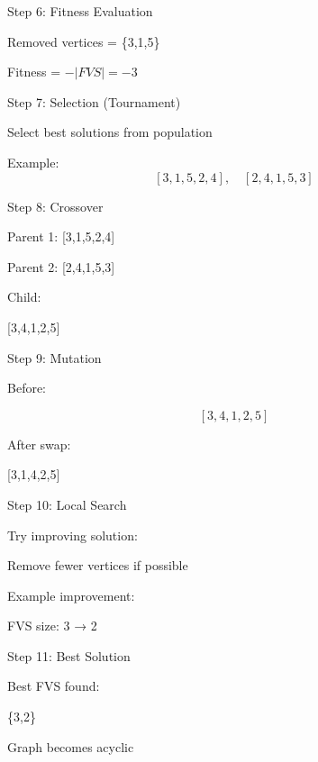 \documentclass[10pt,a4paper]{report}
\theoremstyle{definition}
\begin{document}
{Step 6: Fitness Evaluation}
\begin{center}
	Removed vertices = \{3,1,5\}

	\vspace{0.5cm}
	Fitness = $-|FVS| = -3$
\end{center}

{Step 7: Selection (Tournament)}
\begin{center}
	Select best solutions from population

	\vspace{0.5cm}
	Example:
	\[
		[3,1,5,2,4],\quad [2,4,1,5,3]
	\]
\end{center}

{Step 8: Crossover}
\begin{center}
	Parent 1: [3,1,5,2,4]

	Parent 2: [2,4,1,5,3]

	\vspace{0.5cm}
	Child:

	\Huge
	[3,4,1,2,5]
\end{center}

{Step 9: Mutation}
\begin{center}
	Before:

	\[
		[3,4,1,2,5]
	\]

	\vspace{0.5cm}
	After swap:

	\Huge
	[3,1,4,2,5]
\end{center}

{Step 10: Local Search}
\begin{center}
	Try improving solution:

	\vspace{0.5cm}
	Remove fewer vertices if possible

	\vspace{0.5cm}
	Example improvement:

	\Huge
	FVS size: 3 → 2
\end{center}

{Step 11: Best Solution}
\begin{center}
	Best FVS found:

	\vspace{0.5cm}
	\Huge
	\{3,2\}

	\vspace{0.5cm}
	Graph becomes acyclic
\end{center}
\end{document}
